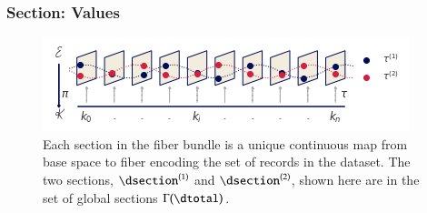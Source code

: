 \documentclass[journal]{vgtc}                %
\begin{document}
 \subsubsection{Section: Values}
 \label{sec:math:data:section}
 \begin{figure}[htb]
  \centering %
  \includegraphics[width=\columnwidth]{fiberbundle.png}
  \caption{Each section in the fiber bundle is a unique continuous map from base space to fiber encoding the set of records in the dataset. The two sections, $\dsection^{(1)}$ and $\dsection^{(2)}$, shown here are in the set of global sections $\Gamma(\dtotal)$.}
  \label{fig:math:data:section}
 \end{figure}
\end{document}
